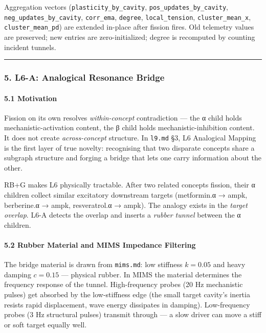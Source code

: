 \documentclass[
  11pt,
  a4paper,
]{article}
\begin{document}
Aggregation vectors (\texttt{plasticity\_by\_cavity},
\texttt{pos\_updates\_by\_cavity}, \texttt{neg\_updates\_by\_cavity},
\texttt{corr\_ema}, \texttt{degree}, \texttt{local\_tension},
\texttt{cluster\_mean\_x}, \texttt{cluster\_mean\_pd}) are extended
in-place after fission fires. Old telemetry values are preserved; new
entries are zero-initialized; degree is recomputed by counting incident
tunnels.

\begin{center}\rule{0.5\linewidth}{0.5pt}\end{center}

\subsubsection{5. L6-A: Analogical Resonance
Bridge}\label{l6-a-analogical-resonance-bridge}

\paragraph{5.1 Motivation}\label{motivation}

Fission on its own resolves \emph{within-concept} contradiction --- the
α child holds mechanistic-activation content, the β child holds
mechanistic-inhibition content. It does not create \emph{across-concept}
structure. In \texttt{l9.md} §3, L6 Analogical Mapping is the first
layer of true novelty: recognising that two disparate concepts share a
subgraph structure and forging a bridge that lets one carry information
about the other.

RB+G makes L6 physically tractable. After two related concepts fission,
their α children collect similar excitatory downstream targets
(metformin.α → ampk, berberine.α → ampk, resveratrol.α → ampk). The
analogy exists in the \emph{target overlap}. L6-A detects the overlap
and inserts a \emph{rubber tunnel} between the α children.

\paragraph{5.2 Rubber Material and MIMS Impedance
Filtering}\label{rubber-material-and-mims-impedance-filtering}

The bridge material is drawn from \texttt{mims.md}: low stiffness
\(k = 0.05\) and heavy damping \(c = 0.15\) --- physical rubber. In MIMS
the material determines the frequency response of the tunnel.
High-frequency probes (20 Hz mechanistic pulses) get absorbed by the
low-stiffness edge (the small target cavity's inertia resists rapid
displacement, wave energy dissipates in damping). Low-frequency probes
(3 Hz structural pulses) transmit through --- a slow driver can move a
stiff or soft target equally well.
\end{document}
